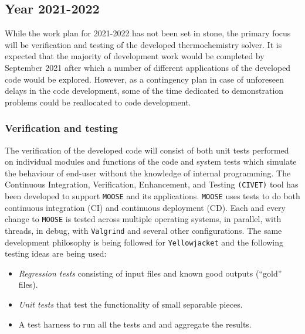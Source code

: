 	\subsection{Year 2021-2022}
	While the work plan for 2021-2022 has not been set in stone, the primary focus will be verification and testing of the developed thermochemistry solver.  It is expected that the majority of development work would be completed by September 2021 after which a number of different applications of the developed code would be explored. However, as a contingency plan in case of unforeseen delays in the code development, some of the time dedicated to demonstration problems could be reallocated to code development.

	\subsubsection{Verification and testing}
		The verification of the developed code will consist of both unit tests performed on individual modules and functions of the code and system tests which simulate the behaviour of end-user without the knowledge of internal programming. The Continuous Integration, Verification, Enhancement, and Testing \texttt{(CIVET)} tool has been developed to support \texttt{MOOSE} and its applications. \texttt{MOOSE} uses tests to do both continuous integration (CI) and continuous deployment (CD). Each and every change to \texttt{MOOSE} is tested across multiple operating systems, in parallel, with threads, in debug, with \texttt{Valgrind} and several other configurations. The same development philosophy is being followed for \texttt{Yellowjacket} and the following testing ideas are being used:
		\begin{itemize}\compresslist
			\item \emph{Regression tests} consisting of input files and known good outputs (``gold'' files).
			\item \emph{Unit tests} that test the functionality of small separable pieces.
			\item A test harness to run all the tests and and aggregate the results.
		\end{itemize}

